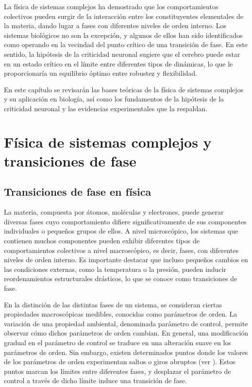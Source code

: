 La física de sistemas complejos ha demostrado que los comportamientos colectivos pueden surgir de la interacción entre los constituyentes elementales de la materia, dando lugar a fases con diferentes niveles de orden interno. Los sistemas biológicos no son la excepción, y algunos de ellos han sido identificados como operando en la vecindad del punto crítico de una transición de fase. En este sentido, la hipótesis de la criticidad neuronal sugiere que el cerebro puede estar en un estado crítico en el límite entre diferentes tipos de dinámicas, lo que le proporcionaría un equilibrio óptimo entre robustez y flexibilidad.

En este capítulo se revisarán las bases teóricas de la física de sistemas complejos y su aplicación en biología, así como los fundamentos de la hipótesis de la criticidad neuronal y las evidencias experimentales que la respaldan.





\section{Física de sistemas complejos y transiciones de fase}

\subsection{Transiciones de fase en física}

La materia, compuesta por átomos, moléculas y electrones, puede generar diversas fases cuyo comportamiento difiere significativamente de sus componentes individuales o pequeños grupos de ellos. A nivel microscópico, los sistemas que contienen muchos componentes pueden exhibir diferentes tipos de comportamientos colectivos a nivel macroscópico, es decir, fases, con diferentes niveles de orden interno. Es importante destacar que incluso pequeños cambios en las condiciones externas, como la temperatura o la presión, pueden inducir reordenamientos estructurales drásticos, lo que se conoce como transiciones de fase.

En la distinción de las distintas fases de un sistema, se consideran ciertas propiedades macroscópicas medibles, conocidas como parámetros de orden. La variación de una propiedad ambiental, denominada parámetro de control, permite observar cómo dichos parámetros de orden cambian. En general, una modificación gradual en el parámetro de control se traduce en una alteración suave en los parámetros de orden. Sin embargo, existen determinados puntos donde los valores de los parámetros de orden experimentan saltos o giros abruptos (ver ). Estos puntos marcan los límites entre diferentes fases, y desplazar el parámetro de control a través de dicho límite induce una transición de fase.

